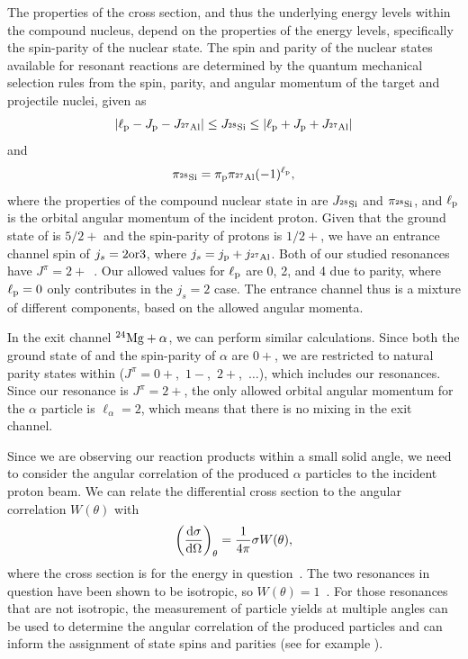 The properties of the cross section, and thus the underlying energy levels
within the compound nucleus, depend on the properties of the energy levels,
specifically the spin-parity of the nuclear state. The spin and parity of the
nuclear states available for resonant reactions are determined by the quantum
mechanical selection rules from the spin, parity, and angular momentum of the
target and projectile nuclei, given as
\[
    \left|\ell_{\rm{p}} - J_{\rm{p}} - J_{{}^{27}\textrm{Al}}\right|
    \leq J_{{}^{28}\textrm{Si}} \leq
    \left|\ell_{\rm{p}} + J_{\rm{p}} + J_{{}^{27}\textrm{Al}}\right|
\]
and
\[
    \pi_{{}^{28}\textrm{Si}} = \pi_{\rm{p}}\pi_{{}^{27}\textrm{Al}}(-1)^{\ell_{\rm{p}}},
\]
where the properties of the compound nuclear state in  are
$J_{{}^{28}\textrm{Si}}$ and $\pi_{{}^{28}\textrm{Si}}$, and $\ell_{\rm{p}}$ is the
orbital angular momentum of the incident proton. Given that the ground state of
 is $5/2+$ and the spin-parity of protons is $1/2+$, we have an
entrance channel spin of $j_s = 2\rm{ or }3$, where
$j_s = j_{\rm{p}} + j_{{}^{27}\textrm{Al}}$. Both of our studied resonances have
$J^{\pi} = 2+$~\cite{Nelson1984}. Our allowed values for $\ell_{\rm{p}}$ are
0, 2, and 4 due to parity, where $\ell_{\rm{p}} = 0$ only contributes in the
$j_s = 2$ case. The entrance channel thus is a mixture of different components,
based on the allowed angular momenta.

In the exit channel ${}^{24}\textrm{Mg} + \alpha$, we can perform similar
calculations. Since both the ground state of  and the spin-parity
of $\alpha$ are $0+$, we are restricted to natural parity states within
 ($J^{\pi} = 0+$,~$1-$,~$2+$,~$\ldots$), which includes
our resonances. Since our resonance is $J^{\pi} = 2+$, the only allowed
orbital angular momentum for the $\alpha$ particle is $\ell_{\alpha} = 2$,
which means that there is no mixing in the exit channel.

Since we are observing our reaction products within a small solid angle, we
need to consider the angular correlation of the produced $\alpha$ particles to
the incident proton beam. We can relate the differential cross section to the
angular correlation $W(\theta)$ with
\[
    \left(\frac{\rm{d}\sigma}{\rm{d}\Omega}\right)_{\theta} =
        \frac{1}{4\pi}\sigma W(\theta),
\]
where the cross section is for the energy in question~\cite{Iliadis}. The two
resonances in question have been shown to be isotropic, so
$W(\theta) = 1$~\cite{Andersen1961}. For those resonances that are not
isotropic, the measurement of particle yields at multiple angles can be used
to determine the angular correlation of the produced particles and can inform
the assignment of state spins and parities (see for example \cite{deBoer2015}).


